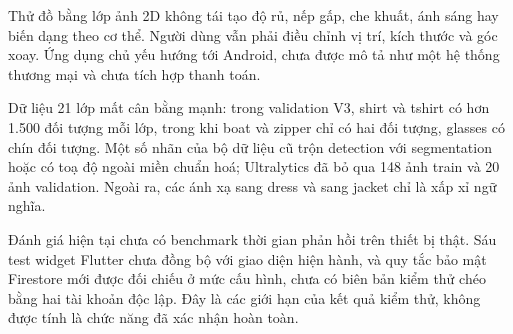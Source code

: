 Thử đồ bằng lớp ảnh 2D không tái tạo độ rủ, nếp gấp, che khuất, ánh sáng hay
biến dạng theo cơ thể. Người dùng vẫn phải điều chỉnh vị trí, kích thước và
góc xoay. Ứng dụng chủ yếu hướng tới Android, chưa được mô tả như một hệ
thống thương mại và chưa tích hợp thanh toán.

Dữ liệu 21 lớp mất cân bằng mạnh: trong validation V3, shirt và tshirt có
hơn 1.500 đối tượng mỗi lớp, trong khi boat và zipper chỉ có hai đối tượng,
glasses có chín đối tượng. Một số nhãn của bộ dữ liệu cũ trộn detection với
segmentation hoặc có toạ độ ngoài miền chuẩn hoá; Ultralytics đã bỏ qua 148
ảnh train và 20 ảnh validation. Ngoài ra, các ánh xạ
 sang dress và  sang jacket chỉ là
xấp xỉ ngữ nghĩa.

Đánh giá hiện tại chưa có benchmark thời gian phản hồi trên thiết bị thật.
Sáu test widget Flutter chưa đồng bộ với giao diện hiện hành, và quy tắc bảo
mật Firestore mới được đối chiếu ở mức cấu hình, chưa có biên bản kiểm thử
chéo bằng hai tài khoản độc lập. Đây là các giới hạn của kết quả kiểm thử,
không được tính là chức năng đã xác nhận hoàn toàn.

